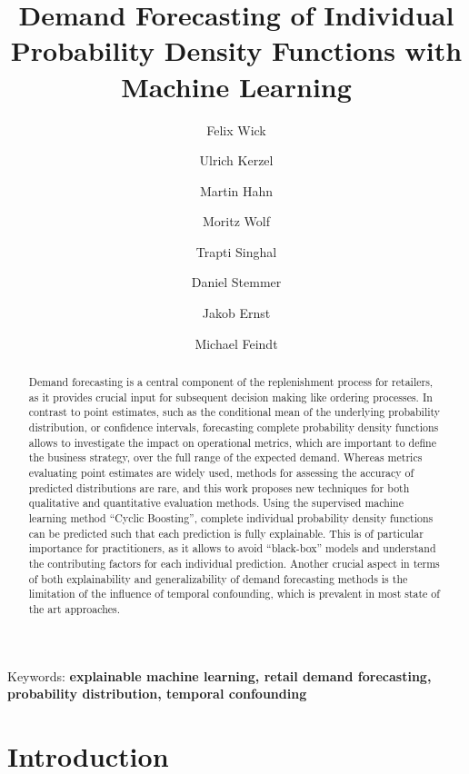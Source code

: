 \documentclass[BCOR=1mm, DIV=calc,10pt,
twoside=true,
twocolumn,
headings=normal]{scrartcl}
\begin{document}
\title{Demand Forecasting of Individual Probability Density Functions with Machine Learning}

\author[1]{Felix Wick}
\author[3]{Ulrich Kerzel}
\author[1]{Martin Hahn}
\author[1]{Moritz Wolf}
\author[2]{Trapti Singhal}
\author[1]{Daniel Stemmer}
\author[1]{Jakob Ernst}
\author[1]{Michael Feindt}

\date{}

\maketitle


\begin{abstract}

Demand forecasting is a central component of the replenishment process for retailers, as it provides crucial input for subsequent decision making like ordering processes. In contrast to point estimates, such as the conditional mean of the underlying probability distribution, or confidence intervals, forecasting complete probability density functions allows to investigate the impact on operational metrics, which are important to define the business strategy, over the full range of the expected demand. Whereas metrics evaluating point estimates are widely used, methods for assessing the accuracy of predicted distributions are rare, and this work proposes new techniques for both qualitative and quantitative evaluation methods. Using the supervised machine learning method ``Cyclic Boosting'', complete individual probability density functions can be predicted such that each prediction is fully explainable. This is of particular importance for practitioners, as it allows to avoid ``black-box'' models and understand the contributing factors for each individual prediction. Another crucial aspect in terms of both explainability and generalizability of demand forecasting methods is the limitation of the influence of temporal confounding, which is prevalent in most state of the art approaches.

\end{abstract}

{Keywords: \textbf{explainable machine learning, retail demand forecasting, probability distribution, temporal confounding}}


\section{Introduction}
\label{sec:Intro}
\end{document}
